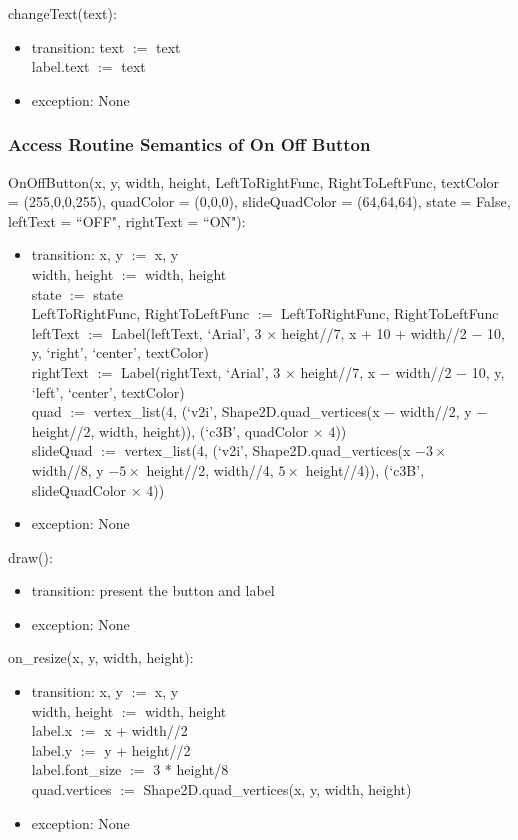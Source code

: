 \documentclass{article}
\begin{document}
\noindent changeText(text):
\begin{itemize}
\item transition: text $:=$ text\\
    label.text $:=$ text
\item exception: None
\end{itemize}

\subsubsection {Access Routine Semantics of On Off Button}
\noindent OnOffButton(x, y, width, height, LeftToRightFunc, RightToLeftFunc, textColor = (255,0,0,255), quadColor = (0,0,0), slideQuadColor = (64,64,64), state = False, leftText = ``OFF", rightText = ``ON"):
\begin{itemize}
\item transition: x, y $:=$ x, y\\
    width, height $:=$ width, height\\
    state $:=$ state\\
    LeftToRightFunc, RightToLeftFunc $:=$ LeftToRightFunc, RightToLeftFunc\\
    leftText $:=$ Label(leftText, `Arial', 3 $\times$ height//7, x + 10 + width//2 $-$ 10, y, `right', `center', textColor)\\
    rightText $:=$ Label(rightText, `Arial', 3 $\times$ height//7, x $-$ width//2 $-$ 10, y, `left', `center', textColor)\\
    quad $:=$ vertex\_list(4, (`v2i', Shape2D.quad\_vertices(x $-$ width//2, y $-$ height//2, width, height)), (`c3B', quadColor $\times$ 4))\\
    slideQuad $:=$ vertex\_list(4, (`v2i', Shape2D.quad\_vertices(x $- 3 \times$ width//8, y $- 5 \times$ height//2, width//4, $5 \times$ height//4)), (`c3B', slideQuadColor $\times$ 4))
\item exception: None
\end{itemize}\vspace{6mm}

\noindent draw():
\begin{itemize}
\item transition: present the button and label
\item exception: None
\end{itemize}\vspace{6mm}

\noindent on\_resize(x, y, width, height):
\begin{itemize}
\item transition: x, y $:=$ x, y\\
    width, height $:=$ width, height\\
    label.x $:=$ x + width//2\\
    label.y $:=$ y + height//2\\
    label.font\_size $:=$ 3 * height/8\\
    quad.vertices $:=$ Shape2D.quad\_vertices(x, y, width, height)
    
\item exception: None
\end{itemize}\vspace{6mm}
\end{document}
